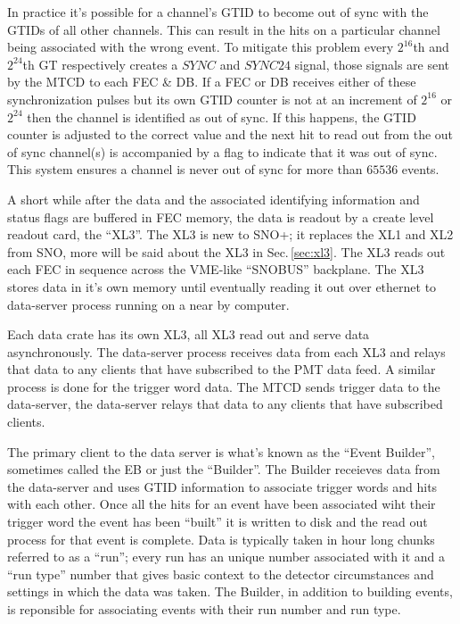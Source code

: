 In practice it's possible for a channel's GTID to become out of sync with the GTIDs of
all other channels.
This can result in the hits on a particular channel being associated with
the wrong event.
To mitigate this problem every $2^{16}$th and $2^{24}$th GT respectively creates a $SYNC$ and
$SYNC24$ signal, those signals are sent by the MTCD to each FEC \& DB.
If a FEC or DB receives either of these synchronization pulses but its own GTID counter is not
at an increment of $2^{16}$ or $2^{24}$ then the channel is identified as out of sync.
If this happens, the GTID counter is adjusted to the correct value and the next hit to read out from the out of sync channel(s) is accompanied
by a flag to indicate that it was out of sync.
This system ensures a channel is never out of sync for more than $65536$ events.

A short while after the data and the associated identifying information and status flags are buffered
in FEC memory, the data is readout by a create level readout card,
the ``XL3''.
The XL3 is new to SNO+; it replaces the XL1 and XL2 from SNO, more will be said about the
XL3 in Sec.\,\ref{sec:xl3}.
The XL3 reads out each FEC in sequence across the VME-like ``SNOBUS'' backplane.
The XL3 stores data in it's own memory until eventually reading it out over
ethernet to data-server process running on a near by computer.

Each data crate has its own XL3, all XL3 read out and serve data asynchronously.
The data-server process receives data from each XL3 and relays that data to
any clients that have subscribed to the PMT data feed.
A similar process is done for the trigger word data. The MTCD sends trigger data
to the data-server, the data-server relays that data to any clients that have subscribed
clients.

The primary client to the data server is what's known as the ``Event Builder'', sometimes
called the EB or just the ``Builder''. The Builder receieves data from the data-server and
uses GTID information to associate trigger words and hits with each other.
Once all the hits for an event have been associated wiht their trigger word the event
has been ``built'' it is written to disk and the read out process for that event is complete.
Data is typically taken in hour long chunks referred to as a ``run'';
every run has an unique number associated with it and a ``run type'' number that
gives basic context to the detector circumstances and settings in which the data was taken.
The Builder, in addition to building events, is reponsible for associating
events with their run number and run type.

